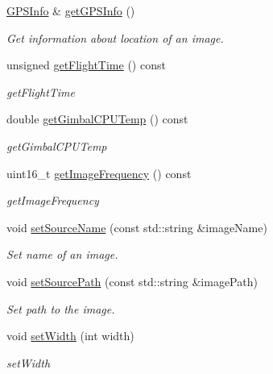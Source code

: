 \begin{DoxyCompactItemize}
\hyperlink{classwtl_1_1_g_p_s_info}{G\+P\+S\+Info} \& \hyperlink{classwtl_1_1_source_meta_data_a7b98944eaf50b06c4065ede57e13342e}{get\+G\+P\+S\+Info} ()
\begin{DoxyCompactList}\small\item\em Get information about location of an image. \end{DoxyCompactList}\item 
unsigned \hyperlink{classwtl_1_1_source_meta_data_a9bd2c8d10826432cf74f8d1f25c9edaa}{get\+Flight\+Time} () const
\begin{DoxyCompactList}\small\item\em get\+Flight\+Time \end{DoxyCompactList}\item 
double \hyperlink{classwtl_1_1_source_meta_data_ad00e12cf26115e37d1303cb9b7dc8fd7}{get\+Gimbal\+C\+P\+U\+Temp} () const
\begin{DoxyCompactList}\small\item\em get\+Gimbal\+C\+P\+U\+Temp \end{DoxyCompactList}\item 
uint16\+\_\+t \hyperlink{classwtl_1_1_source_meta_data_a2e8a400c1afa29b1b910ab7fa4b8ca66}{get\+Image\+Frequency} () const
\begin{DoxyCompactList}\small\item\em get\+Image\+Frequency \end{DoxyCompactList}\item 
void \hyperlink{classwtl_1_1_source_meta_data_a8d244e35bcf262d4651aadff0cb467d0}{set\+Source\+Name} (const std\+::string \&image\+Name)
\begin{DoxyCompactList}\small\item\em Set name of an image. \end{DoxyCompactList}\item 
void \hyperlink{classwtl_1_1_source_meta_data_a5522a30a52467ae0cd124b55b5a78111}{set\+Source\+Path} (const std\+::string \&image\+Path)
\begin{DoxyCompactList}\small\item\em Set path to the image. \end{DoxyCompactList}\item 
void \hyperlink{classwtl_1_1_source_meta_data_ad05a54221a2d34c3a4f2af9d6cd92e12}{set\+Width} (int width)
\begin{DoxyCompactList}\small\item\em set\+Width \end{DoxyCompactList}\item 

\end{DoxyCompactItemize}
